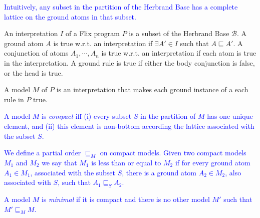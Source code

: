 \documentclass[10pt,twocolumn]{article}
\begin{document}
\textcolor{blue}{
Intuitively, any subset in the partition of the Herbrand Base has a complete lattice on the ground atoms in that subset.
}

An interpretation $I$ of a Flix program $P$ is a subset of the Herbrand Base $\mathcal{B}$.
A ground atom $A$ is true w.r.t. an interpretation if $\exists A' \in I$ such that $A \sqsubseteq A'$. 
A conjunction of atoms $A_1, \cdots, A_n$ is true w.r.t. an interpretation if each atom is true in the interpretation.
A ground rule is true if either the body conjunction is false, or the head is true.

A model $M$ of $P$ is an interpretation that makes each ground instance of a each rule in $P$ true.

\textcolor{blue}{
A model $M$ is \emph{compact} iff
(i) every subset $S$ in the partition of $M$ has one unique element, and 
(ii) this element is non-bottom according the lattice associated with the subset $S$.
}

\textcolor{blue}{
We define a partial order $\sqsubseteq_M$ on compact models. 
Given two compact models $M_1$ and $M_2$ we say that 
$M_1$ is less than or equal to $M_2$ if for every ground atom $A_1 \in M_1$, associated with the subset $S$,
there is a ground atom $A_2 \in M_2$, also associated with $S$, such that $A_1 \sqsubseteq_S A_2$.
}

\textcolor{blue}{
A model $M$ is \emph{minimal} if it is compact and there is no other model $M'$ such that $M' \sqsubseteq_M M$.
}
\end{document}
